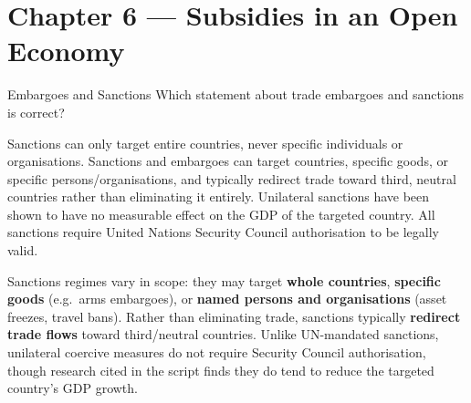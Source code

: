 \section{Chapter 6 — Subsidies in an Open Economy}

\begin{question}[type=mc]{Embargoes and Sanctions}
Which statement about trade embargoes and sanctions is correct?
\begin{choices}
  \choice        Sanctions can only target entire countries, never specific
                 individuals or organisations.
  \correctchoice Sanctions and embargoes can target countries, specific
                 goods, or specific persons/organisations, and typically
                 redirect trade toward third, neutral countries rather than
                 eliminating it entirely.
  \choice        Unilateral sanctions have been shown to have no measurable
                 effect on the GDP of the targeted country.
  \choice        All sanctions require United Nations Security Council
                 authorisation to be legally valid.
\end{choices}
\begin{solution}
  Sanctions regimes vary in scope: they may target \textbf{whole countries},
  \textbf{specific goods} (e.g.\ arms embargoes), or \textbf{named persons
  and organisations} (asset freezes, travel bans). Rather than eliminating
  trade, sanctions typically \textbf{redirect trade flows} toward
  third/neutral countries. Unlike UN-mandated sanctions, unilateral coercive
  measures do not require Security Council authorisation, though research
  cited in the script finds they do tend to reduce the targeted country's
  GDP growth.
\end{solution}
\end{question}

